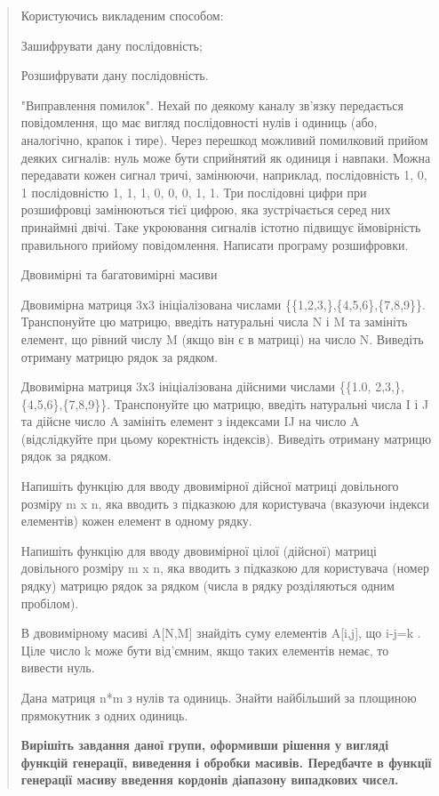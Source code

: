\documentclass[]{article}
\begin{document}
\begin{quote}
Користуючись викладеним способом:

Зашифрувати дану послідовність;

Розшифрувати дану послідовність.

"Виправлення помилок". Нехай по деякому каналу зв'язку передається
повідомлення, що має вигляд послідовності нулів і одиниць (або,
аналогічно, крапок і тире). Через перешкод можливий помилковий прийом
деяких сигналів: нуль може бути сприйнятий як одиниця і навпаки. Можна
передавати кожен сигнал тричі, замінюючи, наприклад, послідовність 1, 0,
1 послідовністю 1, 1, 1, 0, 0, 0, 1, 1. Три послідовні цифри при
розшифровці замінюються тієї цифрою, яка зустрічається серед них
принаймні двічі. Таке укроювання сигналів істотно підвищує ймовірність
правильного прийому повідомлення. Написати програму розшифровки.

Двовимірні та багатовимірні масиви

Двовимірна матриця 3х3 ініціалізована числами
\{\{1,2,3,\},\{4,5,6\},\{7,8,9\}\}. Транспонуйте цю матрицю, введіть
натуральні числа N і M та замініть елемент, що рівний числу M (якщо він
є в матриці) на число N. Виведіть отриману матрицю рядок за рядком.

Двовимірна матриця 3х3 ініціалізована дійсними числами \{\{1.0,
2,3,\},\{4,5,6\},\{7,8,9\}\}. Транспонуйте цю матрицю, введіть
натуральні числа I і J та дійсне число A замініть елемент з індексами IJ
на число A (відслідкуйте при цьому коректність індексів). Виведіть
отриману матрицю рядок за рядком.

Напишіть функцію для вводу двовимірної дійсної матриці довільного
розміру m x n, яка вводить з підказкою для користувача (вказуючи індекси
елементів) кожен елемент в одному рядку.

Напишіть функцію для вводу двовимірної цілої (дійсної) матриці
довільного розміру m x n, яка вводить з підказкою для користувача (номер
рядку) матрицю рядок за рядком (числа в рядку розділяються одним
пробілом).

В двовимірному масиві A{[}N,M{]} знайдіть суму елементів A{[}i,j{]}, що
i-j=k . Ціле число k може бути від'ємним, якщо таких елементів немає, то
вивести нуль.

Дана матриця n*m з нулів та одиниць. Знайти найбільший за площиною
прямокутник з одних одиниць.

\textbf{Вирішіть завдання даної групи, оформивши рішення у вигляді
функцій генерації, виведення і обробки масивів. Передбачте в функції
генерації масиву введення кордонів діапазону випадкових чисел.}


\end{quote}
\end{document}
